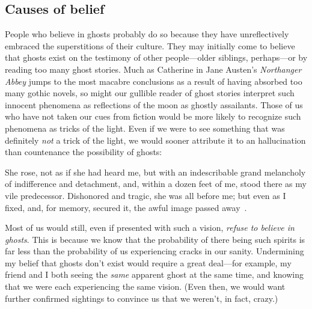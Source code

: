 \documentclass[11pt]{article}
\newenvironment{squote}{%
	\begin{spacing}{1}
	\begin{list}{}{%
	\setlength{\labelwidth}{0pt}%
	\rightmargin\leftmargin%
	}
	\item\relax
	}{%
	\end{list}%
	\end{spacing}
	}
\begin{document}
\begin{spacing}{1.5}
\subsection{Causes of belief}
\label{unger-cause}
People who believe in ghosts probably do so because they have unreflectively embraced the superstitions of their culture. They may initially come to believe that ghosts exist on the testimony of other people---older siblings, perhaps---or by reading too many ghost stories. Much as Catherine in Jane Austen's {\em Northanger Abbey} jumps to the most macabre conclusions as a result of having absorbed too many gothic novels, so might our gullible reader of ghost stories interpret such innocent phenomena as reflections of the moon as ghostly assailants. Those of us who have not taken our cues from fiction would be more likely to recognize such phenomena as tricks of the light. Even if we were to see something that was definitely {\em not} a trick of the light, we would sooner attribute it to an hallucination than countenance the possibility of ghosts:
%
\begin{squote}
She rose, not as if she had heard me, but with an indescribable grand melancholy of indifference and detachment, and, within a dozen feet of me, stood there as my vile predecessor. Dishonored and tragic, she was all before me; but even as I fixed, and, for memory, secured it, the awful image passed away~\citep[58]{james1991}.
\end{squote}
%
Most of us would still, even if presented with such a vision, {\em refuse to believe in ghosts}. This is because we know that the probability of there being such spirits is far less than the probability of us experiencing cracks in our sanity. Undermining my belief that ghosts don't exist would require a great deal---for example, my friend and I both seeing the {\em same} apparent ghost at the same time, and knowing that we were each experiencing the same vision. (Even then, we would want further confirmed sightings to convince us that we weren't, in fact, crazy.)


\end{spacing}
\end{document}
